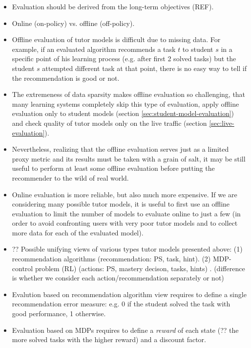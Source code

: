\begin{itemize}
\item Evaluation should be derived from the long-term objectives (REF).
\item Online (on-policy) vs. offline (off-policy).
\item Offline evaluation of tutor models is difficult due to missing data.
  For example, if an evaluated algorithm recommends a task $t$ to student $s$
  in a specific point of his learning process (e.g. after first 2 solved tasks)
  but the student $s$ attempted different task at that point,
  there is no easy way to tell if the recommendation is good or not.
\item The extremeness of data sparsity makes offline evaluation so challenging,
  that many learning systems completely skip this type of evaluation,
  apply offline evaluation only to student models
  (section \ref{sec:student-model-evaluation})
  and check quality of tutor models only on the live traffic
  (section \ref{sec:live-evaluation}).
\item Nevertheless, realizing that the offline evaluation serves just as
  a limited proxy metric and its results must be taken with a grain of salt,
  it may be still useful to perform at least some offline evaluation before
  putting the recommender to the wild of real world.
\item Online evaluation is more reliable, but also much more expensive.
  If we are considering many possible tutor models, it is useful
  to first use an offline evaluation to limit the number of models to evaluate
  online to just a few (in order to avoid confronting users with very poor
  tutor models and to collect more data for each of the evaluated model).

\item ?? Possible unifying views of various types tutor models presented above:
  (1) recommendation algorithms (recommendation: PS, task, hint).
  (2) MDP-control problem (RL) (actions: PS, mastery decison, tasks, hints) .
  (difference is whether we consider each action/recommendation separately or not)
\item Evalution based on recommendation algorithm view requires to define
  a single recommendation error measure: e.g. 0 if the student solved
  the task with good performance, 1 otherwise.
\item Evaluation based on MDPs requires to define a \emph{reward} of each state
  (?? the more solved tasks with the higher reward) and a discount factor.


\end{itemize}

